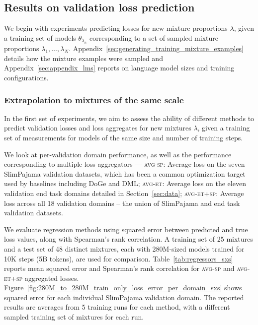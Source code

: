 

\subsection{Results on validation loss prediction}
\label{sec:results-loss-prediction}

We begin with experiments predicting losses for new mixture proportions $\lambda$, given a training set of models $\theta_{\lambda_n}$ corresponding to a set of sampled mixture proportions $\lambda_1,\ldots,\lambda_N$. Appendix~\ref{sec:generating_training_mixture_examples}  details how the mixture examples were sampled and Appendix~\ref{sec:appendix_lms} reports on language model sizes and  training configurations.





\subsubsection*{Extrapolation to mixtures of the same scale}

In the first set of experiments, we aim to assess the ability of different methods to predict validation losses and loss aggregates for new mixtures $\lambda$, given a training set of measurements for models of the same size and number of training steps.



We look at per-validation domain performance, as well as the performance corresponding to multiple loss aggregators ---
 \textsc{avg-sp}: Average loss on the seven SlimPajama validation datasets,%
    which has been a common optimization target used by baselines including DoGe and DML; 
    \textsc{avg-et}: Average loss on the eleven validation end task domains detailed in Section~\ref{sec:data};
    \textsc{avg-et+sp}: Average loss across all 18 validation domains -- the union of SlimPajama and end task validation datasets.%


We evaluate regression methods using squared error between predicted and true loss values, along with Spearman's rank correlation. A training set of 25 mixtures and a test set of 48 distinct mixtures, each with 280M-sized models trained for 10K steps (5B tokens), are used for comparison. Table~\ref{tab:regressors_sxs} reports mean squared error and Spearman’s rank correlation for \textsc{avg-sp} and \textsc{avg-et+sp} aggregated losses. Figure~\ref{fig:280M_to_280M_train_only_loss_error_per_domain_sxs} shows squared error for each individual SlimPajama validation domain.  The reported results are averages from 5 training runs for each method, with a different sampled training set of mixtures for each run.

